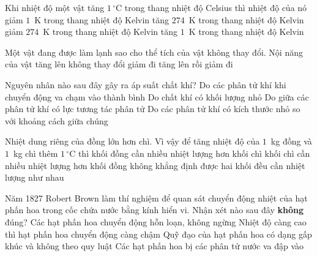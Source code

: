 	\begin{ex}%
		Khi nhiệt độ một vật tăng $1\,^\circ\text{C}$ trong thang nhiệt độ Celsius thì nhiệt độ của nó
		\choice
		{giảm $1$~K trong thang nhiệt độ Kelvin}
		{tăng $274$~K trong thang nhiệt độ Kelvin}
		{giảm $274$~K trong thang nhiệt độ Kelvin}
		{\True tăng $1$~K trong thang nhiệt độ Kelvin}
	\end{ex}

	\begin{ex}%
		Một vật đang được làm lạnh sao cho thể tích của vật không thay đổi. Nội năng của vật
		\choice
		{tăng lên}
		{không thay đổi}
		{\True giảm đi}
		{tăng lên rồi giảm đi}
	\end{ex}

	\begin{ex}%
		Nguyên nhân nào sau đây gây ra áp suất chất khí?
		\choice
		{\True Do các phân tử khí khi chuyển động va chạm vào thành bình}
		{Do chất khí có khối lượng nhỏ}
		{Do giữa các phân tử khí có lực tương tác phân tử}
		{Do các phân tử khí có kích thước nhỏ so với khoảng cách giữa chúng}
	\end{ex}

	\begin{ex}%
		Nhiệt dung riêng của đồng lớn hơn chì. Vì vậy để tăng nhiệt độ của $1$~kg đồng và $1$~kg chì thêm $1\,^\circ\text{C}$ thì
		\choice
		{\True khối đồng cần nhiều nhiệt lượng hơn khối chì}
		{khối chì cần nhiều nhiệt lượng hơn khối đồng}
		{không khẳng định được}
		{hai khối đều cần nhiệt lượng như nhau}
	\end{ex}

	\begin{ex}%
		Năm 1827 Robert Brown làm thí nghiệm để quan sát chuyển động nhiệt của hạt phấn hoa trong cốc chứa nước bằng kính hiển vi. Nhận xét nào sau đây \textbf{không} đúng?
		\choice
		{Các hạt phấn hoa chuyển động hỗn loạn, không ngừng}
		{\True Nhiệt độ càng cao thì hạt phấn hoa chuyển động càng chậm}
		{Quỹ đạo của hạt phấn hoa có dạng gấp khúc và không theo quy luật}
		{Các hạt phấn hoa bị các phân tử nước va đập vào}
	\end{ex}

